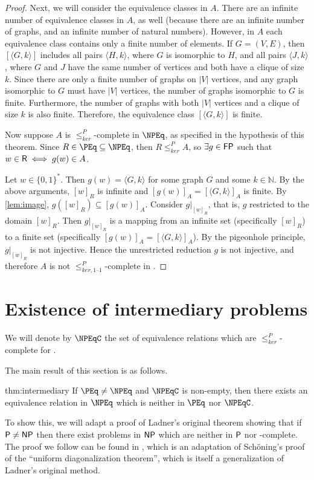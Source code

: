 \documentclass[draft]{article}
\theoremstyle{definition} \newtheorem{openproblem}[openproblem]{Open problem}
\theoremstyle{definition} \newtheorem{definition}[definition]{Definition}
\newcommand{\sigmastar}{\{0, 1\}^{*}} %
\newcommand{\kr}{\leq^{P}_{ker}} %
\newcommand{\kri}{\leq^{P}_{ker,1\text{--}1}} %
\newcommand{\pair}[2]{\langle#1,#2\rangle} %
\newcommand{\printintermediarytheorem}{If $\PEq\neq\NPEq$ and $\NPEqC$ is non-empty, then there exists an equivalence relation in $\NPEq$ which is neither in $\PEq$ nor $\NPEqC$.}
\begin{document}
\begin{proof}
  Next, we will consider the equivalence classes in $A$.
  There are an infinite number of equivalence classes in $A$, as well (because there are an infinite number of graphs, and an infinite number of natural numbers).
  However, in $A$ each equivalence class contains only a finite number of elements.
  If $G=(V,E)$, then $[\pair{G}{k}]$ includes all pairs $\pair{H}{k}$, where $G$ is isomorphic to $H$, and all pairs $\pair{J}{k}$, where $G$ and $J$ have the same number of vertices and both have a clique of size $k$.
  Since there are only a finite number of graphs on $|V|$ vertices, and any graph isomorphic to $G$ must have $|V|$ vertices, the number of graphs isomorphic to $G$ is finite.
  Furthermore, the number of graphs with both $|V|$ vertices and a clique of size $k$ is also finite.
  Therefore, the equivalence class $[\pair{G}{k}]$ is finite.

  Now suppose $A$ is $\kr$-complete in $\NPEq$, as specified in the hypothesis of this theorem.
  Since $R\in\PEq\subseteq\NPEq$, then $R\kr A$, so $\exists g\in\FP$ such that $w\in\R\iff g(w)\in A$.

  Let $w\in\sigmastar$.
  Then $g(w)=\pair{G}{k}$ for some graph $G$ and some $k\in\mathbb{N}$.
  By the above arguments, $[w]_R$ is infinite and $[g(w)]_A=[\pair{G}{k}]_A$ is finite.
  By \autoref{lem:image}, $g([w]_R)\subseteq [g(w)]_A$.
  Consider $g|_{[w]_R}$, that is, $g$ restricted to the domain $[w]_R$.
  Then $g|_{[w]_R}$ is a mapping from an infinite set (specifically $[w]_R$) to a finite set (specifically $[g(w)]_A=[\pair{G}{k}]_A$).
  By the pigeonhole principle, $g|_{[w]_R}$ is not injective.
  Hence the unrestricted reduction $g$ is not injective, and therefore $A$ is not $\kri$-complete in \NPEq.
\end{proof}

\section{Existence of intermediary problems}

We will denote by $\NPEqC$ the set of equivalence relations which are $\kr$-complete for \NPEq.

The main result of this section is as follows.
\begin{reptheorem}{thm:intermediary}
  \printintermediarytheorem
\end{reptheorem}
To show this, we will adapt a proof of Ladner's original theorem\cite{ladner} showing that if $\P\neq\NP$ then there exist problems in $\NP$ which are neither in $\P$ nor \NP-complete.
The proof we follow can be found in \cite{bdg95}, which is an adaptation of Sch\"{o}ning's proof of the ``uniform diagonalization theorem''\cite{schoning}, which is itself a generalization of Ladner's original method.
\end{document}
